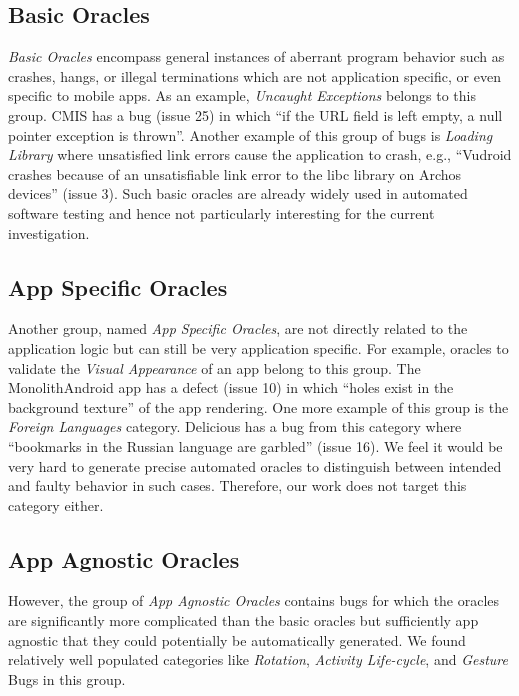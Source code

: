 \subsection{Basic Oracles}
\label{sec:basicOracles}
\emph{Basic Oracles} encompass general instances of aberrant program behavior such as crashes, hangs, or illegal terminations which are not application specific, or even specific to mobile apps. 
As an example, \emph{Uncaught Exceptions} belongs to this group. CMIS has a bug (issue 25) in which ``if the URL field is left empty, a null pointer exception is thrown''. Another example of this group of bugs is \emph{Loading Library} where unsatisfied link errors cause the application to crash, e.g., ``Vudroid crashes because of an unsatisfiable link error to the libc library on Archos devices'' (issue 3).
Such basic oracles are already widely used in automated software testing and hence not particularly interesting for the current investigation.

\subsection{App Specific Oracles}
\label{sec:appSpecificOracles}
Another group, named \emph{App Specific Oracles}, are not directly related to the application logic but can still be very application specific. For example, oracles to validate the \emph{Visual Appearance} of an app belong to this group. The MonolithAndroid app has a defect (issue 10) in which ``holes exist in the background texture'' of the app rendering. One more example of this group is the \emph{Foreign Languages} category. Delicious has a bug from this category where ``bookmarks in the Russian language are garbled'' (issue 16). We feel it would be very hard to generate precise automated oracles to distinguish between intended and faulty behavior in such cases. Therefore, our work does not target this category either.

\subsection{App Agnostic Oracles}
\label{sec:appAgnosticOracles}
However, the group of \textit{App Agnostic Oracles} contains bugs for which the oracles are significantly more complicated than the basic oracles but sufficiently app agnostic that they could potentially be automatically generated. We found relatively well populated categories like \emph{Rotation}, \emph{Activity Life-cycle}, and \emph{Gesture} Bugs in this group.


